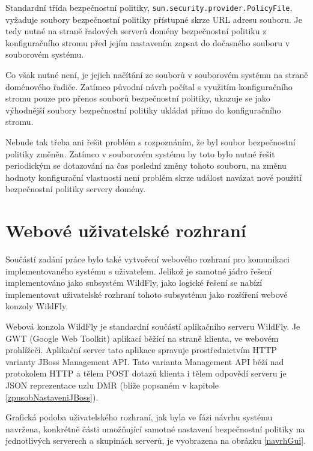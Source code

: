 Standardní třída bezpečnostní politiky, {\tt sun.security.provider.PolicyFile}, vyžaduje soubory bezpečnostní politiky přístupné skrze URL adresu souboru.
Je tedy nutné na straně řadových serverů domény bezpečnostní politiku z konfiguračního stromu před jejím nastavením zapsat do dočasného souboru v souborovém systému.

Co však nutné není, je jejich načítání ze souborů v souborovém systému na straně doménového řadiče. Zatímco původní návrh počítal s využitím konfiguračního stromu pouze pro přenos souborů bezpečnostní politiky, ukazuje se jako výhodnější soubory bezpečnostní politiky ukládat přímo do konfiguračního stromu.

Nebude tak třeba ani řešit problém s rozpoznáním, že byl soubor bezpečnostní politiky změněn. Zatímco v souborovém systému by toto bylo nutné řešit periodickým se dotazování na čas poslední změny tohoto souboru, na změnu hodnoty konfigurační vlastnosti není problém skrze událost navázat nové použití bezpečnostní politiky servery domény.

\section{Webové uživatelské rozhraní} \label{navrhGUI}

Součástí zadání práce bylo také vytvoření webového rozhraní pro komunikaci implementovaného systému s uživatelem.
Jelikož je samotné jádro řešení implementováno jako subsystém WildFly, jako logické řešení se nabízí implementovat uživatelské rozhraní tohoto subsystému jako rozšíření webové konzoly WildFly.

Webová konzola WildFly je standardní součástí aplikačního serveru WildFly. Je GWT (Google Web Toolkit) aplikací běžící na straně klienta, ve webovém prohlížeči.
Aplikační server tato aplikace spravuje prostřednictvím HTTP varianty JBoss Management API.
Tato varianta Management API běží nad protokolem HTTP a tělem POST dotazů klienta i tělem odpovědí serveru je JSON reprezentace uzlu DMR (blíže popsaném v kapitole \ref{zpusobNastaveniJBoss}).
\cite{WildFlyManagementAPIreference}

Grafická podoba uživatelského rozhraní, jak byla ve fázi návrhu systému navržena, konkrétně části umožňující samotné nastavení bezpečnostní politiky na jednotlivých serverech a skupinách serverů, je vyobrazena na obrázku \ref{navrhGui}.

